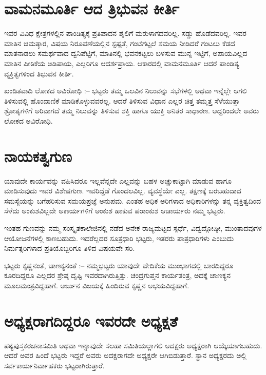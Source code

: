 \section*{ವಾಮನಮೂರ್ತಿ ಆದ ತ್ರಿಭುವನ ಕೀರ್ತಿ}  

ಇವರ ವಿವಿಧ ಕ್ಷೇತ್ರಗಳಲ್ಲಿನ  ಪಾಂಡಿತ್ಯಕ್ಕೆ ಪ್ರತಿಪಾದನ ಶೈಲಿಗೆ ಮರುಳಾಗದವರಿಲ್ಲ.  ಸಡ್ಡು ಹೊಡೆದವರಿಲ್ಲ.  ಇವರ ಮಾತಿನ ಚಮತ್ಕಾರ, ವಿಷಯ ನಿರೂಪಣೆಯಲ್ಲಿನ ಸ್ಪಷ್ಟತೆ, ಗಂಟೆಗಟ್ಟಲೆ ಸಮಯ ನೀಡಿದರೆ ಗಂಟಲು ಕೆಡದೆ ಮಾತನಾಡಲು ಸಮರ್ಥವಾದ ದ್ವನಿಪೆಟ್ಟಿಗೆ, ಮಾತಿನಲ್ಲಿ ಭವನಕಟ್ಟಲು ಬಳಸುವ ಮುನ್ನ ಇಟ್ಟಿಗೆ, ಅಪಾಯವಿಲ್ಲದ ಮಾತಿನ ಪೀಠಿಕೆಯ ಅಡಿಪಾಯ, ಎಲ್ಲರಿಗೂ ಆದರ್ಶಪ್ರಾಯ.  ಆಕಾರದಲ್ಲಿ ವಾಮನಮೂರ್ತಿ ಆದರೆ ಪಾಂಡಿತ್ಯ ವ್ಯಕ್ತಿತ್ವಗಳಿಂದ ತಿಭುವನ ಕೀರ್ತಿ.

ಖಂಡಿತವಾದಿ ಲೋಕದ ಅವಿರೋಧಿ :–  ಭಟ್ಟರು ತಮ್ಮ ಒಲವಿನ ನಿಲುವನ್ನು ಸಭೆಗಳಲ್ಲಿ ಅಥವಾ ಇನ್ನೆಲ್ಲೇ ಆಗಲಿ ತಿಳಿಸುವಲ್ಲಿ ಹೊಂದಾಣಿಕೆ ಮಾಡಿಕೊಳ್ಳುವವರಲ್ಲ.  ಆದರೆ ತಿಳಿಸುವ ವಿಧಾನ ಎಲ್ಲರ ಚಿತ್ತ ತಮ್ಮತ್ತ ಸೆಳೆಯುತ್ತಾ ಶ್ರೋತೃಗಳಿಗೆ ಅರಿವಾಗದೆ ತಮ್ಮ ನಿಲುವನ್ನು ತಿಳಿಸುವ ಶಕ್ತಿ ಹಾಗೂ ಯುಕ್ತಿ ಅನಿತರ ಸಾಧಾರಣ.  ಆದ್ದರಿಂದಲೇ ಅವರು ಲೋಕದ ಅವಿರೋಧಿ.

\section*{ನಾಯಕತ್ವಗುಣ} 

ಯಾವುದೇ ಕಾರ್ಯವನ್ನು ವಹಿಸಿದರೂ ಇಲ್ಲವೆನ್ನದೇ ಎಲ್ಲವನ್ನು ಬಹಳ ಅಚ್ಚುಕಾಟ್ಟಾಗಿ ಮಾಡುವ ಹಾಗೂ ಮಾಡಿಸುವುದು ಇವರ ವಿಶೇಷಗುಣ.  ಇವರಿದ್ದೆಡೆ ಗೊಂದಲವಿಲ್ಲ.  ವ್ಯವಸ್ಥೆಯೇ ಎಲ್ಲ.  ತಕ್ಷಣಕ್ಕೆ ಬರಬಹುದಾದ ಸಮಸ್ಯೆಯನ್ನು ಬಗೆಹರಿಸುವ ಸಮಯಪ್ರಜ್ಞೆ ಅನುಪಮ.  ಎಂತಹ ಅಧಿಕ ಅರಿಗಳಾದ ಅಧಿಕಾರಿಗಳನ್ನು ತನ್ನ ವ್ಯಕ್ತಿತ್ವದಿಂದ ಸೆಳೆದು ಅಂಕುಶವಿಲ್ಲದೇ ಅಕಾರ್ಯಗಳಿಗೆ ಅಂಕುಶ ಹಾಕುವ ಪರಾಂಕುಶ ಆಚಾರ್ಯರು ನಮ್ಮ ಭಟ್ಟರು.

ಇಂತಹ ಗುಣವನ್ನು ನಮ್ಮ ಸಂಸ್ಕೃತಕಾಲೇಜಿನಲ್ಲಿ ನಡೆದ ಅನೇಕ ರಾಜ್ಯಮಟ್ಟದ ಸ್ಪರ್ಧೆ, ವಿದ್ವದ್ಗೋಷ್ಠೀ, ಮುಂತಾದವುಗಳ ಆಯೋಜನೆಗಳಲ್ಲಿ ಕಾಣಬಹುದು.  ಇದರೆಲ್ಲದರ ಸೂತ್ರಧಾರಿ ಭಟ್ಟರು, ಇತರರು  ಪಾತ್ರಧಾರಿಗಳು ಎಂಬುದು ನಿರ್ಮತ್ಸರಿಗಳಾದ ಪ್ರತಿಯೊಬ್ಬರಿಗೂ ತಿಳಿದ ವಿಷಯವೇ ಸರಿ.

ಭಟ್ಟರು ಕೃಷ್ಣನಂತೆ, ಚಾಣಕ್ಯನಂತೆ :–  ನಮ್ಮಭಟ್ಟರು ಯಾವುದೇ ವೇದಿಕೆಯ ಮುಂಭಾಗದಲ್ಲಿ ಬಾರದಿದ್ದರೂ ಕೂರದಿದ್ದರೂ ಎಲ್ಲದರ ಶ್ರೇಷ್ಠ ದೃಷ್ಟಿ   ಇವರದಾಗಿರುತ್ತಿತ್ತು. ಚಂದ್ರಗುಪ್ತನ ಕಾರ್ಯತಂತ್ರ, ಅದಕ್ಕೆ ಚಾಣಕ್ಯನ ಮೂಲಮಂತ್ರವಿದ್ದಹಾಗೆ.  ಅರ್ಜುನ ವಿಜಯಕ್ಕೆ ಹಿಂದಿರುವ ಕೃಷ್ಣನ ಅಭಯವಿದ್ದಹಾಗೆ. 

\section*{ಅಧ್ಯಕ್ಷರಾಗದಿದ್ದರೂ ಇವರದೇ ಅಧ್ಯಕ್ಷತೆ} 

ಪಠ್ಯಪುಸ್ತಕರಚನಾಸಮಿತಿ ಅಥವಾ ಇನ್ನಾವುದೇ ಸಲಹಾ ಸಮಿತಿಯಲ್ಲಾಗಲಿ ಅದಕ್ಷರು ಅಧ್ಯಕ್ಷರಾಗಿ ಆಯ್ಕೆಯಾಗಬಹುದು.  ಆದರೆ ಅವರ ಹಿಂದೆ ಭಟ್ಟರು ಇದ್ದರೆ ಅವರು ಅದಕ್ಷರಾಗದೇ ಅಧ್ಯಕ್ಷರೇ ಆಗಿಬಿಡುತ್ತಾರೆ.  ಸ್ಥಾನ ಅಧ್ಯಕ್ಷರದು ಅಲ್ಲಿ ಸರ್ವಕಾರ್ಯನಿರ್ವಾಹಕರು ಭಟ್ಟರಾಗಿರುತ್ತಾರೆ.

